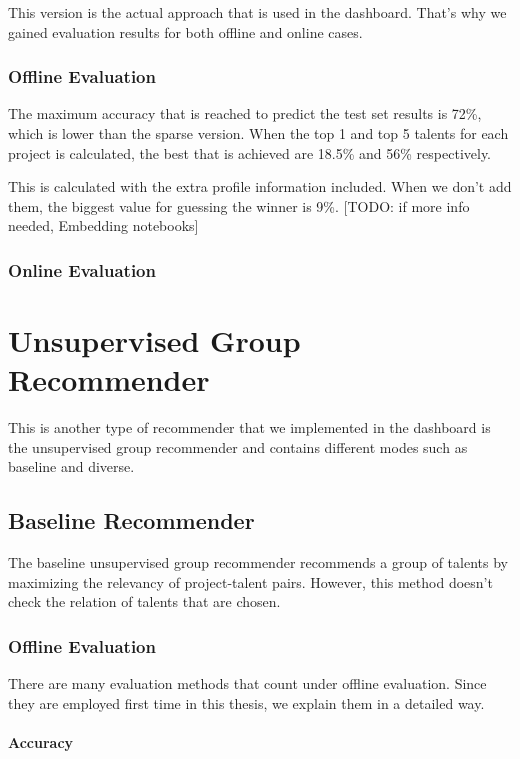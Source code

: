 This version is the actual approach that is used in the dashboard. That's why we gained evaluation results for both offline and online cases. 

\subsubsection{Offline Evaluation}

The maximum accuracy that is reached to predict the test set results is 72\%, which is lower than the sparse version. When the top 1 and top 5 talents for each project is calculated, the best that is achieved are 18.5\% and 56\% respectively. 

This is calculated with the extra profile information included. When we don't add them, the biggest value for guessing the winner is 9\%. [TODO: if more info needed, Embedding notebooks]

\subsubsection{Online Evaluation}

\section{Unsupervised Group Recommender}

This is another type of recommender that we implemented in the dashboard is the unsupervised group recommender and contains different modes such as baseline and diverse. 

\subsection{Baseline Recommender}

The baseline unsupervised group recommender recommends a group of talents by maximizing the relevancy of project-talent pairs. However, this method doesn't check the relation of talents that are chosen. 

\subsubsection{Offline Evaluation}

There are many evaluation methods that count under offline evaluation. Since they are employed first time in this thesis, we explain them in a detailed way.

\paragraph{Accuracy}

